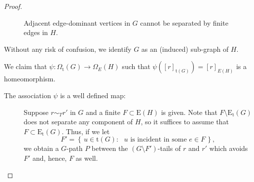 \documentclass[10pt]{article}
\numberwithin{equation}{subsection}
\theoremstyle{remark}
\newcommand{\set}[1]{\left\{\, {#1} \,\right\}}
\begin{document}
\begin{proof}
\begin{figure}[ht]
    \caption{Adjacent edge-dominant vertices in $G$ cannot be separated by finite edges in $H$.}
\label{FIGURE_Timid-to-Edges}
    \end{figure}
    
    Without any risk of confusion, we identify $G$ as an (induced) sub-graph of $H$.

    We claim that $\psi\colon \Omega_{\mathrm{t}}(G)\to \Omega_E(H)$ such that $\psi([r]_{\mathrm{t}(G)}) = [r]_{E(H)}$ is a homeomorphism. 
    \begin{description}
        \item[The association $\psi$ is a well defined map:] Suppose $r\sim_{T}r'$ in $G$ and a finite $F\subset \mathrm{E}(H)$ is given. Note that $F\setminus \mathrm{E}_\mathrm{t}(G)$ does not separate any component of $H$, so it suffices to assume that $F\subset \mathrm{E}_\mathrm{t}(G)$. Thus, if we let \[F' = \set{u\in \mathrm{t}(G): \text{ $u$ is incident in some $e\in F$}},\] we obtain a $G$-path $P$ between the $(G\setminus F')$-tails of $r$ and $r'$ which avoids $F'$ and, hence, $F$ as well.


\end{description}
\end{proof}
\end{document}
